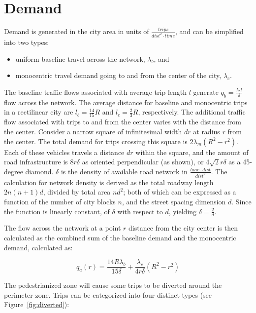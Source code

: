\documentclass{article}
\begin{document}
\section{Demand}
Demand is generated in the city area in units of $\frac{trips}{dist^2 \cdot time}$, and can be simplified into two types:

\begin{itemize}
    \item uniform baseline travel across the network, $\lambda_b$, and 
    \item monocentric travel demand going to and from the center of the city, $\lambda_c$. 
\end{itemize}

The baseline traffic flows associated with average trip length $l$ generate $q_b = \frac{\lambda_b l}{\delta}$ flow across the network. The average distance for baseline and monocentric trips in a rectilinear city are $l_b=\frac{14}{15}R$ and $l_c=\frac{2}{3}R$, respectively. The additional traffic flow associated with trips to and from the center varies with the distance from the center. Consider a narrow square of infinitesimal width $dr$ at radius $r$ from the center. The total demand for trips crossing this square is $2\lambda_m (R^2 - r^2)$. Each of these vehicles travels a distance $dr$ within the square, and the amount of road infrastructure is $8r\delta$ as oriented perpendicular (as shown), or $4\sqrt{2}r\delta$ as a 45-degree diamond. $\delta$ is the density of available road network in $\frac{lane \cdot dist}{dist^2}$. The calculation for network density is derived as the total roadway length $2n(n+1)d$, divided by total area $nd^2$; both of which can be expressed as a function of the number of city blocks $n$, and the street spacing dimension $d$. Since the function is linearly constant, of $\delta$ with respect to $d$, yielding $\delta = \frac{2}{d}$.

The flow across the network at a point $r$ distance from the city center is then calculated as the combined sum of the baseline demand and the monocentric demand, calculated as:

\begin{equation}
    q_a(r) = \frac{14 R \lambda_b}{15\delta} + \frac{\lambda_c}{4 r \delta} \left(R^2 - r^2 \right)
    \label{eq:flowacross}
\end{equation}


The pedestrianized zone will cause some trips to be diverted around the perimeter zone. Trips can be categorized into four distinct types (see Figure~\ref{fig:diverted}):
\end{document}

